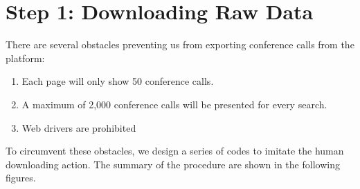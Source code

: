 \documentclass[11pt]{article}
\begin{document}
\section{Step 1: Downloading Raw Data}
\par There are several obstacles preventing us from exporting conference calls from the platform:
\begin{enumerate}
	\item Each page will only show 50 conference calls.
	\item A maximum of 2,000 conference calls will be presented for every search.
	\item Web drivers are prohibited
\end{enumerate}
\par To circumvent these obstacles, we design a series of codes to imitate the human downloading action. The summary of the procedure are shown in the following figures.
\end{document}
